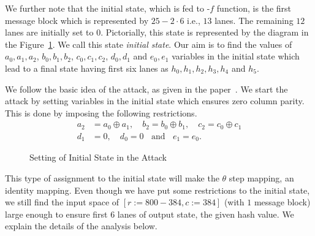 We further note that the initial state, which is fed to \Keccak-$f$ function, is the first message block which is represented by $25-2\cdot 6$ i.e., $13$ lanes. The remaining $12$ lanes are initially set to $0$. Pictorially, this state is represented by the diagram in the Figure~\ref{initial_state}. We call this state \emph{initial state}.
Our aim is to find the values of $a_0, a_1, a_2$, $b_0, b_1, b_2$, $c_0, c_1, c_2$, $d_0, d_1$ and $e_0, e_1$ variables in the initial state which lead to a final state having first six lanes as $h_0, h_1, h_2,h_3, h_4$ and $h_5$. 

We follow the basic idea of the attack, as given in the paper~\cite{naya2011practical}.
We start the attack by setting variables in the initial state which ensures zero column parity. 
This is done by imposing the following restrictions.
\begin{align}\nonumber
a_2 &= a_0 \oplus a_1,\quad b_2 = b_0 \oplus b_1, \quad c_2 = c_0 \oplus c_1\\ \label{cond_state1}
d_1 & = 0,\quad d_0 = 0\;\;\text{ and }\;\; e_1 = e_0. 
\end{align}

\begin{figure}
\begin{center}
\end{center}
\caption{Setting of Initial State in the Attack\label{initial_state}}
\end{figure}
This type of assignment to the initial state will make the {$\theta$} step mapping, an identity mapping. Even though we have put some restrictions to the initial state, we still find the input space of \KECCAK{}$[r:=800-384, c:=384]$ (with $1$ message block) large enough to ensure first $6$ lanes of output state, the given hash value. We explain the details of the analysis below. 

